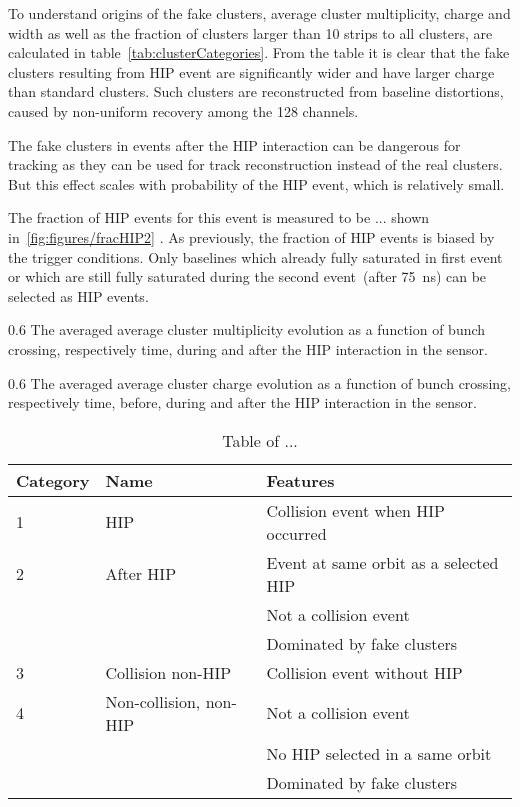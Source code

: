 To understand origins of the fake clusters, average cluster multiplicity, charge and width as well as the fraction of clusters larger than 10 strips to all clusters, are calculated in table~\ref{tab:clusterCategories}. From the table it is clear that the fake clusters resulting from HIP event are significantly wider and have larger charge than standard clusters. Such clusters are reconstructed from baseline distortions, caused by non-uniform recovery among the 128 channels.

The fake clusters in events after the HIP interaction can be dangerous for tracking as they can be used for track reconstruction instead of the real clusters. But this effect scales with probability of the HIP event, which is relatively small.

The fraction of HIP events for this event is measured to be ... shown in~\ref{fig:figures/fracHIP2} . As previously, the fraction of HIP events is biased by the trigger conditions. Only baselines which already fully saturated in first event or which are still fully saturated during the second event~(after 75~ns) can be selected as HIP events.


                 {0.6}       %
                 {The averaged average cluster multiplicity evolution as a function of bunch crossing, respectively time,  during and after the HIP interaction in the sensor. } %

                 {0.6}       %
                 {The averaged average cluster charge evolution as a function of bunch crossing, respectively time, before,  during and after the HIP interaction in the sensor. } %

\begin{table}[h]
\begin{center}
\begin{tabular}{|l|l|l|}
\hline
Category & Name  & Features \\
\hline
1 & HIP & Collision event when HIP occurred \\
\hline
2 & After HIP & Event at same orbit as a selected HIP \\
& & Not a collision event \\
& & Dominated by fake clusters \\
\hline
3 & Collision non-HIP & Collision event without HIP \\
\hline
4 & Non-collision, non-HIP  & Not a collision event \\
& & No HIP selected in a same orbit \\
& & Dominated by fake clusters \\
\hline
\end{tabular}
\caption[Table caption text]{Table of ... }
\label{tab:eventCategories}
\end{center}
\end{table}


